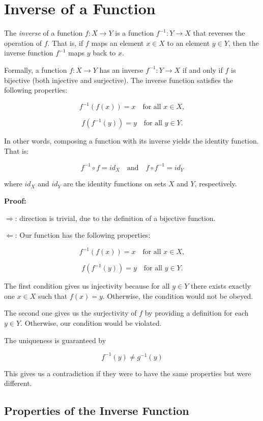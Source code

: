 \section{Inverse of a Function}

The \emph{inverse} of a function \(f: X \to Y\) is a function \(f^{-1}: Y \to X\) that
reverses the operation of \(f\). That is, if \(f\) maps an element \(x \in X\) to an
element \(y \in Y\), then the inverse function \(f^{-1}\) maps \(y\) back to \(x\).

Formally, a function \(f: X \to Y\) has an inverse \(f^{-1}: Y \to X\)
if and only if \(f\) is bijective (both injective and surjective). The inverse function satisfies the
following properties:

\[
	f^{-1}(f(x)) = x \quad \text{for all } x \in X,
\]

\[
	f(f^{-1}(y)) = y \quad \text{for all } y \in Y.
\]

In other words, composing a function with its inverse yields the identity function. That is:

\[
	f^{-1} \circ f = id_X \quad \text{and} \quad f \circ f^{-1} = id_Y
\]

where \(id_X\) and \(id_Y\) are the identity functions on sets \(X\) and \(Y\), respectively.

\textbf{Proof:}

\(\Rightarrow\): direction is trivial, due to the definition of a bijective function.

\(\Leftarrow\): Our function has the following properties:

\[
	f^{-1}(f(x)) = x \quad \text{for all } x \in X,
\]

\[
	f(f^{-1}(y)) = y \quad \text{for all } y \in Y.
\]

The first condition gives us injectivity because for all \(y \in Y\) there exists exactly one \(x \in X\)
such that \(f(x) = y\). Otherwise, the condition would not be obeyed.

The second one gives us the surjectivity of \(f\) by providing a definition for each \(y \in Y\). Otherwise,
our condition would be violated.

The uniqueness is guaranteed by

\[
	f^{-1}(y) \ne g^{-1}(y)
\]

This gives us a contradiction if they were to have the same properties but were different.

\QED

\subsection{Properties of the Inverse Function}

